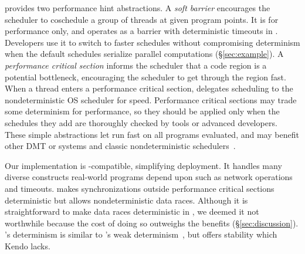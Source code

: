 

\parrot provides two performance hint abstractions.  A \emph{soft
  barrier} encourages the scheduler to coschedule a group of threads at
given program points.  It is for performance only, and operates as a
barrier with deterministic timeouts in \parrot.  Developers use it to switch
to faster schedules without compromising determinism
when the default schedules serialize parallel
computations (\S\ref{sec:example}).  A \emph{performance critical section}
informs the scheduler that a code region is a potential
bottleneck, encouraging the scheduler to get through the region fast.
When a thread enters a performance critical section, \parrot delegates scheduling to the
nondeterministic OS scheduler for speed.  
Performance critical sections may trade some determinism for
performance, so they should be applied only when the schedules they add
are thoroughly checked by tools or advanced developers.
These simple abstractions
let \parrot run fast on all programs evaluated, and
may benefit other DMT or \smt systems and classic nondeterministic
schedulers~\cite{coschedule:sigmetrics96, coschedule, partial-barrier:atc06}.


Our \parrot implementation is \pthread-compatible, simplifying deployment.
It handles many diverse constructs real-world programs depend upon such as
network operations and timeouts.  \parrot makes synchronizations outside
performance critical sections deterministic but allows nondeterministic
data races.  Although it is
straightforward to make data races deterministic in \parrot,
we deemed it not worthwhile because the cost of doing so outweighs the
benefits (\S\ref{sec:discussion}).  \parrot's determinism is similar to
\kendo's weak determinism~\cite{kendo:asplos09}, but \parrot offers stability
which Kendo lacks.

